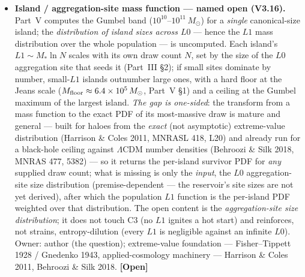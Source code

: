 \documentclass[11pt]{article}
\newcommand{\open}{\textcolor{red!70!black}{\textbf{[Open]}}}
\newcommand{\msun}{M_\odot}
\begin{document}
\begin{itemize}[leftmargin=2.6em,itemsep=3pt]
\item[\textbf{(M)}] \textbf{Island / aggregation-site mass function --- named open (V3.16).} Part~V computes the Gumbel band ($10^{10}$--$10^{11}\,\msun$) for a \emph{single} canonical-size island; the \emph{distribution of island sizes across $L0$} --- hence the $L1$ mass distribution over the whole population --- is uncomputed. Each island's $L1\sim M_*\ln N$ scales with its own draw count $N$, set by the size of the $L0$ aggregation site that seeds it (Part~III \S2); if small sites dominate by number, small-$L1$ islands outnumber large ones, with a hard floor at the Jeans scale ($M_{\rm floor}\approx6.4\times10^{5}\,\msun$, Part~V \S1) and a ceiling at the Gumbel maximum of the largest island. \emph{The gap is one-sided}: the transform from a mass function to the exact PDF of its most-massive draw is mature and general --- built for haloes from the \emph{exact} (not asymptotic) extreme-value distribution (Harrison \& Coles 2011, MNRASL 418, L20) and already run for a black-hole ceiling against $\Lambda$CDM number densities (Behroozi \& Silk 2018, MNRAS 477, 5382) --- so it returns the per-island survivor PDF for \emph{any} supplied draw count; what is missing is only the \emph{input}, the $L0$ aggregation-site size distribution (premise-dependent --- the reservoir's site sizes are not yet derived), after which the population $L1$ function is the per-island PDF weighted over that distribution. The open content is the \emph{aggregation-site size distribution}; it does not touch C3 (no $L1$ ignites a hot start) and reinforces, not strains, entropy-dilution (every $L1$ is negligible against an infinite $L0$). Owner: author (the question); extreme-value foundation --- Fisher--Tippett 1928 / Gnedenko 1943, applied-cosmology machinery --- Harrison \& Coles 2011, Behroozi \& Silk 2018. \open
\end{itemize}
\end{document}

